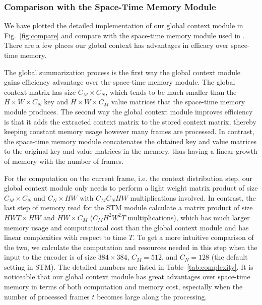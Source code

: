 \documentclass[runningheads]{llncs}
\begin{document}
\subsubsection{Comparison with the Space-Time Memory Module}

We have plotted the detailed implementation of our global context module in Fig.~\ref{fig:compare} and compare with the space-time memory module used in \cite{stm}. There are a few places our global context has advantages in efficacy over space-time memory.

The global summarization process is the first way the global context module gains efficiency advantage over the space-time memory module. The global context matrix has size $C_M \times C_N$, which tends to be much smaller than the $H \times W \times C_N$
key and $H \times W \times C_M$ value matrices that the space-time memory module produces. The second way the global context module improves efficiency is that it adds the extracted context matrix to the stored context matrix, thereby keeping constant memory usage however many frames are processed. In contrast, the space-time memory module concatenates the obtained key and value matrices to the original key and value matrices in the memory, thus having a linear growth of memory with the number of frames.

For the computation on the current frame, i.e. the context distribution step, our global context module only needs to perform a light weight matrix product of size $C_M \times C_N$ and $C_N \times HW$ with $C_MC_NHW$ multiplications involved. In contrast, the last step of memory read for the STM module calculate a matrix product of size $HWT \times HW$ and $HW \times C_M$ ($C_MH^2W^2T$ multiplications), which has much larger memory usage and computational cost than the global context module and has linear complexities with respect to time $T$. To get a more intuitive comparison of the two, we calculate the computation and resources needed in this step when the input to the encoder is of size $384 \times 384$, $C_M = 512$, and $C_N = 128$ (the default setting in STM). The detailed numbers are listed in Table~\ref{tab:complexity}. It is noticeable that our global context module has great advantages over space-time memory in terms of both computation and memory cost, especially when the number of processed frames $t$ becomes large along the processing.
\end{document}

